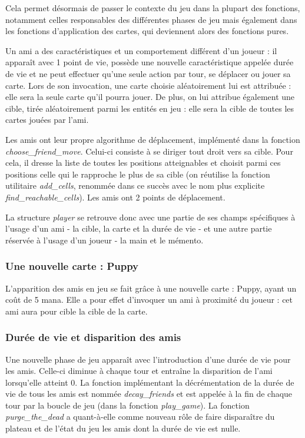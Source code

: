 \documentclass[12pt]{article}
\begin{document}
Cela permet désormais de passer le contexte du jeu dans la plupart des fonctions, notamment celles responsables des différentes phases de jeu mais également dans les fonctions d'application des cartes, qui deviennent alors des fonctions pures.

\bigbreak

Un ami a des caractéristiques et un comportement différent d'un joueur : il apparaît avec 1 point de vie, possède une nouvelle caractéristique appelée durée de vie et ne peut effectuer qu'une seule action par tour, se déplacer ou jouer sa carte. Lors de son invocation, une carte choisie aléatoirement lui est attribuée : elle sera la seule carte qu'il pourra jouer. De plus, on lui attribue également une cible, tirée aléatoirement parmi les entités en jeu : elle sera la cible de toutes les cartes jouées par l'ami.

Les amis ont leur propre algorithme de déplacement, implémenté dans la fonction \textit{choose\_friend\_move}. Celui-ci consiste à se diriger tout droit vers sa cible. Pour cela, il dresse la liste de toutes les positions atteignables et choisit parmi ces positions celle qui le rapproche le plus de sa cible (on réutilise la fonction utilitaire \textit{add\_cells}, renommée dans ce succès avec le nom plus explicite \textit{find\_reachable\_cells}). Les amis ont 2 points de déplacement.

La structure \textit{player} se retrouve donc avec une partie de ses champs spécifiques à l'usage d'un ami - la cible, la carte et la durée de vie - et une autre partie réservée à l'usage d'un joueur - la main et le mémento.

\subsubsection{Une nouvelle carte : Puppy}

L'apparition des amis en jeu se fait grâce à une nouvelle carte : Puppy, ayant un coût de 5 mana. Elle a pour effet d'invoquer un ami à proximité du joueur : cet ami aura pour cible la cible de la carte.

\subsubsection{Durée de vie et disparition des amis}

Une nouvelle phase de jeu apparaît avec l'introduction d'une durée de vie pour les amis. Celle-ci diminue à chaque tour et entraîne la disparition de l'ami lorsqu'elle atteint 0. La fonction implémentant la décrémentation de la durée de vie de tous les amis est nommée \textit{decay\_friends} et est appelée à la fin de chaque tour par la boucle de jeu (dans la fonction \textit{play\_game}). La fonction \textit{purge\_the\_dead} a quant-à-elle comme nouveau rôle de faire disparaître du plateau et de l'état du jeu les amis dont la durée de vie est nulle.
\end{document}
